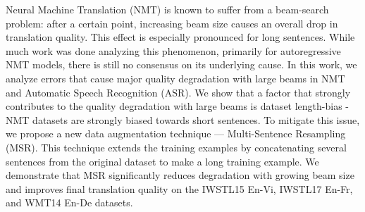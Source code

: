 Neural Machine Translation (NMT) is known to suffer from a beam-search problem: after a certain point, increasing beam size causes an overall drop in translation quality. This effect is especially pronounced for long sentences. While much work was done analyzing this phenomenon, primarily for autoregressive NMT models, there is still no consensus on its underlying cause. In this work, we analyze errors that cause major quality degradation with large beams in NMT and Automatic Speech Recognition (ASR). We show that a factor that strongly contributes to the quality degradation with large beams is dataset length-bias - NMT datasets are strongly biased towards short sentences. To mitigate this issue, we propose a new data augmentation technique --- Multi-Sentence Resampling (MSR). This technique extends the training examples by concatenating several sentences from the original dataset to make a long training example. We demonstrate that MSR significantly reduces degradation with growing beam size and improves final translation quality on the IWSTL15 En-Vi, IWSTL17 En-Fr, and WMT14 En-De datasets.
